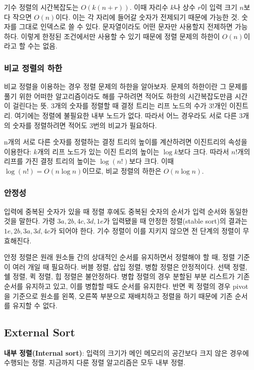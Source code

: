 기수 정렬의 시간복잡도는 $O(k(n + r))$. 이때 자리수 $k$나 상수 $r$이 입력 크기 $n$보다 작으면 $O(n)$이다. 이는 각 자리에 들어갈 숫자가 전제되기 때문에 가능한 것. 숫자를 그대로 인덱스로 쓸 수 있다. 문자열이라도 어떤 문자만 사용할지 전제하면 가능하다. 이렇게 한정된 조건에서만 사용할 수 있기 때문에 정렬 문제의 하한이 $O(n)$이라고 할 수는 없음.

\subsubsection{비교 정렬의 하한}

비교 정렬을 이용하는 경우 정렬 문제의 하한을 알아보자. 문제의 하한이란 그 문제를 풀기 위한 어떠한 알고리즘이라도 해를 구하려면 적어도 하한의 시간복잡도만큼 시간이 걸린다는 뜻. 3개의 숫자를 정렬할 때 결정 트리는 리프 노드의 수가 $3!$개인 이진트리. 여기에는 정렬에 불필요한 내부 노드가 없다. 따라서 어느 경우라도 서로 다른 3개의 숫자를 정렬하려면 적어도 3번의 비교가 필요하다.

n개의 서로 다른 숫자를 정렬하는 결정 트리의 높이를 계산하려면 이진트리의 속성을 이용한다: $k$개의 리프 노드가 있는 이진 트리의 높이는 $\log k$보다 크다. 따라서 $n!$개의 리프를 가진 결정 트리의 높이는 $\log(n!)$보다 크다. 이때 $\log(n!) = O(n \log n)$이므로, 비교 정렬의 하한은 $O(n \log n)$.

\subsubsection{안정성}

입력에 중복된 숫자가 있을 때 정렬 후에도 중복된 숫자의 순서가 입력 순서와 동일한 것을 말한다. 가령 $3a, 2b, 4c, 3d, 1e$가 입력됐을 때 안정한 정렬(stable sort)의 결과는 $1e, 2b, 3a, 3d, 4c$가 되어야 한다. 기수 정렬이 이를 지키지 않으면 전 단계의 정렬이 무효해진다.

안정 정렬은 원래 원소들 간의 상대적인 순서를 유지하면서 정렬해야 할 때, 정렬 기준이 여러 개일 때 필요하다. 버블 정렬, 삽입 정렬, 병합 정렬은 안정적이다. 선택 정렬, 쉘 정렬, 퀵 정렬, 힙 정렬은 불안정하다. 병합 정렬의 경우 분할된 부분 리스트가 기존 순서를 유지하고 있고, 이를 병합할 때도 순서를 유지한다. 반면 퀵 정렬의 경우 pivot을 기준으로 원소를 왼쪽, 오른쪽 부분으로 재배치하고 정렬을 하기 때문에 기존 순서를 유지할 수 없다.

\subsection{External Sort}

\textbf{내부 정렬(Internal sort)}: 입력의 크기가 메인 메모리의 공간보다 크지 않은 경우에 수행되는 정렬. 지금까지 다룬 정렬 알고리즘은 모두 내부 정렬.

